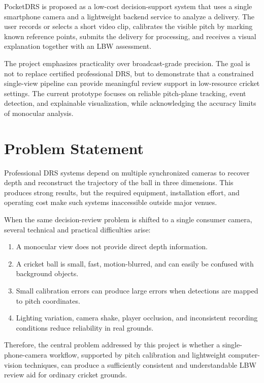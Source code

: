 \documentclass[12pt,a4paper]{article}
\begin{document}
PocketDRS is proposed as a low-cost decision-support system that uses a single smartphone camera and a lightweight backend service to analyze a delivery. The user records or selects a short video clip, calibrates the visible pitch by marking known reference points, submits the delivery for processing, and receives a visual explanation together with an LBW assessment.

The project emphasizes practicality over broadcast-grade precision. The goal is not to replace certified professional DRS, but to demonstrate that a constrained single-view pipeline can provide meaningful review support in low-resource cricket settings. The current prototype focuses on reliable pitch-plane tracking, event detection, and explainable visualization, while acknowledging the accuracy limits of monocular analysis.

\section{Problem Statement}

Professional DRS systems depend on multiple synchronized cameras to recover depth and reconstruct the trajectory of the ball in three dimensions. This produces strong results, but the required equipment, installation effort, and operating cost make such systems inaccessible outside major venues.

When the same decision-review problem is shifted to a single consumer camera, several technical and practical difficulties arise:

\begin{enumerate}
    \item A monocular view does not provide direct depth information.
    \item A cricket ball is small, fast, motion-blurred, and can easily be confused with background objects.
    \item Small calibration errors can produce large errors when detections are mapped to pitch coordinates.
    \item Lighting variation, camera shake, player occlusion, and inconsistent recording conditions reduce reliability in real grounds.
\end{enumerate}

Therefore, the central problem addressed by this project is whether a single-phone-camera workflow, supported by pitch calibration and lightweight computer-vision techniques, can produce a sufficiently consistent and understandable LBW review aid for ordinary cricket grounds.
\end{document}
